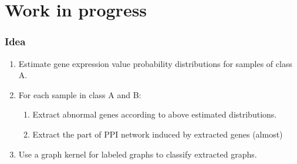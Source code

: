 \documentclass{beamer}
\begin{document}
\section{Work in progress}
\begin{frame}
  \frametitle{Idea}
  \begin{enumerate}
\footnotesize
  \item Estimate gene expression value probability distributions for samples of class A. \pause
  \item For each sample in class A and B:
    \begin{enumerate}
\scriptsize
    \item Extract abnormal genes according to above estimated distributions.
    \item Extract the part of PPI network induced by extracted genes (almost)
    \end{enumerate}\pause
  \item Use a graph kernel for labeled graphs to classify extracted graphs. 
  \end{enumerate}
\end{frame}
\end{document}
